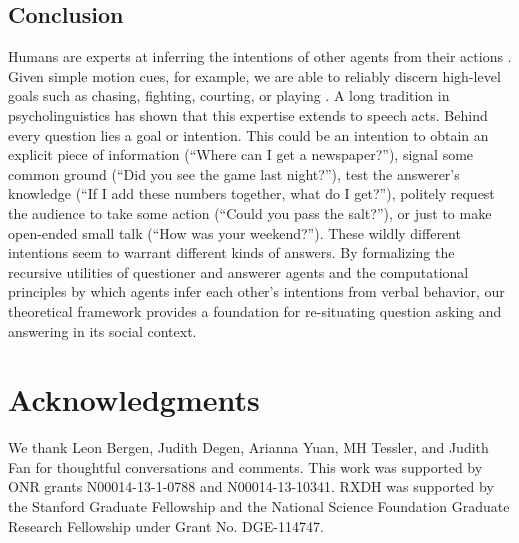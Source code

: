 \documentclass[11pt, floatsintext]{apa6}
\begin{document}
\subsection{Conclusion}
Humans are experts at inferring the intentions of other agents from their actions \cite{TomaselloCarpenter___Moll05_IntentionsCulturalCognition, BakerSaxeTenenbaum09_ActionUnderstandingInversePlanning}. Given simple motion cues, for example, we are able to reliably discern high-level goals such as chasing, fighting, courting, or playing \cite{BarrettToddMillerBlythe05_IntentionFromMotionCues, HeiderSimmel44_Animacy}. A long tradition in psycholinguistics has shown that this expertise extends to speech acts.  Behind every question lies a goal or intention. This could be an intention to obtain an explicit piece of information (``Where can I get a newspaper?''), signal some common ground (``Did you see the game last night?''), test the answerer's knowledge (``If I add these numbers together, what do I get?''), politely request the audience to take some action (``Could you pass the salt?''), or just to make open-ended small talk (``How was your weekend?''). These wildly different intentions seem to warrant different kinds of answers. %
By formalizing the recursive utilities of questioner and answerer agents and the computational principles by which agents infer each other's intentions from verbal behavior, our theoretical framework provides a foundation for re-situating question asking and answering in its social context.

\section{\bf Acknowledgments}
\small
\noindent We thank Leon Bergen, Judith Degen, Arianna Yuan, MH Tessler, and Judith Fan for thoughtful conversations and comments. This work was supported by ONR grants N00014-13-1-0788 and N00014-13-10341. RXDH was supported by the Stanford Graduate Fellowship and the National Science Foundation Graduate Research Fellowship under Grant No. DGE-114747.



\end{document}
